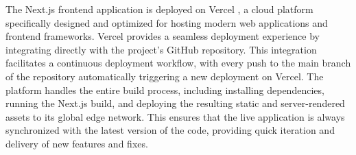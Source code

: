 The Next.js frontend application is deployed on Vercel \cite{NEXTJS}, a cloud platform specifically designed and optimized for hosting modern web applications and frontend frameworks. Vercel provides a seamless deployment experience by integrating directly with the project's GitHub repository. This integration facilitates a continuous deployment workflow, with every push to the main branch of the repository automatically triggering a new deployment on Vercel. The platform handles the entire build process, including installing dependencies, running the Next.js build, and deploying the resulting static and server-rendered assets to its global edge network. This ensures that the live application is always synchronized with the latest version of the code, providing quick iteration and delivery of new features and fixes.